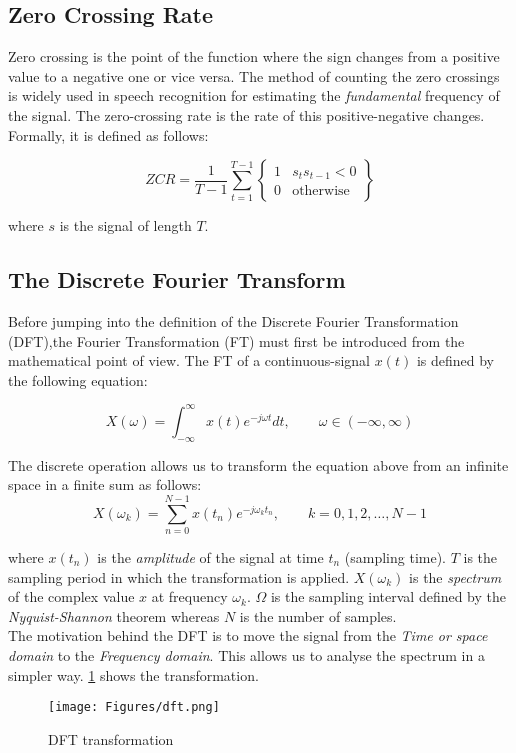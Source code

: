 \subsection{Zero Crossing Rate}
\label{ssubs:Zero Crossing Rate}
Zero crossing is the point of the function where the sign changes from a positive value to a negative one or vice versa. The method of counting the zero crossings is widely used in speech recognition for estimating the \textit{fundamental} frequency of the signal. The zero-crossing rate is the rate of this positive-negative changes. Formally, it is defined as follows:

\begin{equation}
ZCR = \frac{1}{T-1} \sum_{t=1}^{T-1} \begin{Bmatrix}
										1  & s_t s_{t-1} < 0 \\
										0 & \text{otherwise}
									 \end{Bmatrix}
\end{equation}

\noindent where $s$ is the signal of length $T$.

\subsection{The Discrete Fourier Transform}
\label{ssubs:discrete_fourier_transform}
Before jumping into the definition of the Discrete Fourier Transformation (DFT),the Fourier Transformation (FT) must first be introduced from the mathematical point of view. The FT of a continuous-signal $x(t)$ is defined by the following equation:

\begin{equation}
X(\omega) = \int_{-\infty}^\infty x(t)e^{-j\omega t} dt, \qquad \omega\in(-\infty,\infty)
\end{equation}

\noindent The discrete operation allows us to transform the equation above from an infinite space in a finite sum as follows:
\begin{equation}
X(\omega_k ) = \sum_{n=0}^{N-1}x(t_n)e^{-j\omega_k t_n}, \qquad k=0,1,2,\ldots,N-1
\end{equation}

\noindent where $x(t_n)$ is the \textit{amplitude} of the signal at time $t_n$ (sampling time). $T$ is the sampling period in which the transformation is applied. $X(\omega_k )$ is the \textit{spectrum} of the complex value $x$ at frequency $\omega_k$. $\Omega$ is the sampling interval defined by the \textit{Nyquist-Shannon} theorem whereas $N$ is the number of samples. \\

\noindent The motivation behind the DFT is to move the signal from the \textit{Time or space domain} to the \textit{Frequency domain}. This allows us to analyse the spectrum in a simpler way. \ref{fig:dft} shows the transformation.

\begin{figure}[!ht]
	\centering
	\texttt{[image: Figures/dft.png]}
	\caption{DFT transformation \cite{dft_matlab}}
	\label{fig:dft}
\end{figure}

